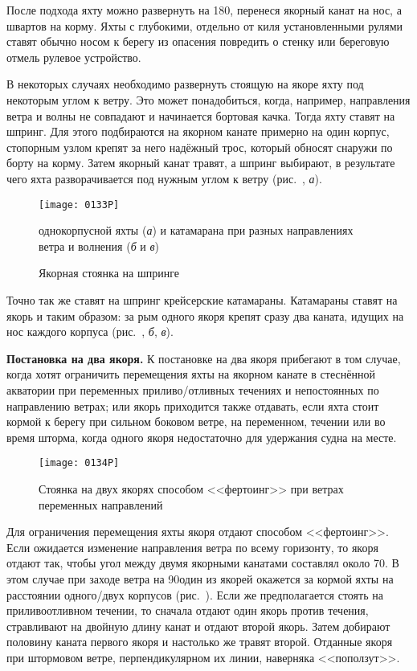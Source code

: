 После подхода яхту можно развернуть на 180\gr, перенеся якорный канат
на нос, а швартов на корму. Яхты с глубокими, отдельно от киля
установленными рулями ставят обычно носом к берегу из опасения
повредить о стенку или береговую отмель рулевое устройство.

В некоторых случаях необходимо развернуть стоящую на якоре яхту под
некоторым углом к ветру. Это может понадобиться, когда, например,
направления ветра и волны не совпадают и начинается бортовая
качка. Тогда яхту ставят на шпринг. Для этого подбираются на якорном
канате примерно на один корпус, стопорным узлом крепят за него
надёжный трос, который обносят снаружи по борту на корму. Затем
якорный канат травят, а шпринг выбирают, в результате чего яхта
разворачивается под нужным углом к ветру (рис.~, \textit{а}).

\begin{figure*}[h]
  \centering{}
  \texttt{[image: 0133P]}
  \caption{Якорная стоянка на шпринге}
  \label{fig:133}
  \small
  \centering{}
  однокорпусной яхты (\textit{а}) и катамарана при разных направлениях ветра и волнения (\textit{б} и \textit{в})
\end{figure*}

Точно так же ставят на шпринг крейсерские катамараны. Катамараны
ставят на якорь и таким образом: за рым одного якоря крепят сразу два
каната, идущих на нос каждого корпуса (рис.~, \textit{б},
\textit{в}).

\textbf{Постановка на два якоря.} К постановке на два якоря прибегают
в том случае, когда хотят ограничить перемещения яхты на якорном
канате в стеснённой акватории при переменных приливо\-/отливных
течениях и непостоянных по направлению ветрах; или якорь приходится
также отдавать, если яхта стоит кормой к берегу при сильном боковом
ветре, на переменном, течении или во время шторма, когда одного якоря
недостаточно для удержания судна на месте.

\begin{figure}[h]
  \centering{}
  \texttt{[image: 0134P]}
  \caption{Стоянка на двух якорях способом <<фертоинг>> при ветрах
    переменных направлений}
  \label{fig:134}
\end{figure}

Для ограничения перемещения яхты якоря отдают способом
<<фертоинг>>. Если ожидается изменение направления ветра по всему
горизонту, то якоря отдают так, чтобы угол между двумя якорными
канатами составлял около 70\gr. В этом случае при заходе ветра
на 90\gr один из якорей окажется за кормой яхты на расстоянии
одного\-/двух корпусов (рис.~). Если же предполагается стоять
на приливоотливном течении, то сначала отдают один якорь против
течения, стравливают на двойную длину канат и отдают второй
якорь. Затем добирают половину каната первого якоря и настолько же
травят второй. Отданные якоря при штормовом ветре, перпендикулярном их
линии, наверняка <<поползут>>.

